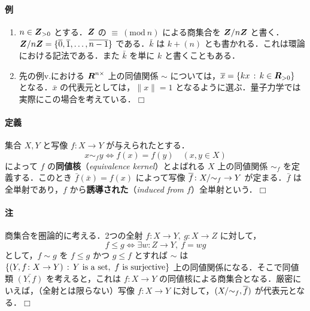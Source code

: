 \documentclass[pandoc,base=10pt,b5j,precisetext]{bxjsarticle}
\providecommand{\tightlist}{%
  \setlength{\itemsep}{0pt}\setlength{\parskip}{0pt}}
\let\oldparagraph\paragraph
\renewcommand{\paragraph}[1]{\oldparagraph{#1}\mbox{}}
\begin{document}
\hypertarget{ux4f8b-3}{%
\paragraph{例}\label{ux4f8b-3}}

\begin{enumerate}
\def\labelenumi{\roman{enumi})}
\tightlist
\item
  \(n \in \boldsymbol{Z}_{> 0}\) とする．\(\boldsymbol{Z}\) の
  \(\equiv\ (\mathrm{mod}\ n)\) による商集合を \(\boldsymbol{Z}/ n \boldsymbol{Z}\)
  と書く．\(\boldsymbol{Z} / n \boldsymbol{Z} = \{ \overline{0}, \overline{1}, \dotsc, \overline{n - 1} \}\)
  である．\(\bar k\) は \(k + (n)\)
  とも書かれる．これは環論における記法である．また \(\bar k\) を単に
  \(k\) と書くこともある．
\item
  先の例v.における \(\boldsymbol{R}^{n \times}\) 上の同値関係 \(\sim\)
  については，\(\overline{x} = \{ k x \,:\, k \in \boldsymbol{R}_{> 0} \}\)
  となる．\(\bar x\) の代表元としては，\(\| x \| = 1\)
  となるように選ぶ．量子力学では実際にこの場合を考えている．\(\Box\)
\end{enumerate}

\hypertarget{ux5b9aux7fa9-1}{%
\paragraph{定義}\label{ux5b9aux7fa9-1}}

集合 \(X, Y\) と写像 \(f \colon X \to Y\) が与えられたとする． \[
x \sim_f y \Longleftrightarrow f(x) = f(y) \quad (x, y \in X)
\] によって \(f\) の\textbf{同値核}（\emph{equivalence
kernel}）とよばれる \(X\) 上の同値関係 \(\sim_f\) を定義する．このとき
\(\bar f(\bar x) = f(x)\) によって写像
\(\overline{f} \colon {X}/\!\,{\sim}_f \to Y\) が定まる．\(\bar f\)
は全単射であり，\(f\) から\textbf{誘導された}（\emph{induced from
\(f\)}）全単射という．\(\Box\)

\hypertarget{ux6ce8}{%
\paragraph{注}\label{ux6ce8}}

商集合を圏論的に考える．2つの全射
\(f \colon X \to Y,\ g \colon X \to Z\) に対して， \[
f \le g \Longleftrightarrow \exists w \colon Z \to Y,\ f = wg
\] として，\(f \sim g\) を \(f \le g\) かつ \(g \le f\) とすれば
\(\sim\) は
\(\{ (Y, f \colon X \to Y) \deli Y \ \text{is a set}, \ f \ \text{is surjective} \}\)
上の同値関係になる．そこで同値類 \(\bar{(Y, f)}\) を考えると，これは
\(f \colon X \to Y\)
の同値核による商集合となる．厳密にいえば，（全射とは限らない）写像
\(f \colon X \to Y\) に対して，\(({X}/\!\,{\sim}_f, \overline{f})\)
が代表元となる．\(\Box\)
\end{document}
